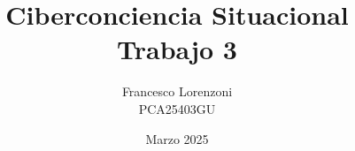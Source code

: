
\usepackage[T1]{fontenc}
\usepackage{lmodern}

\title{Ciberconciencia Situacional\\Trabajo 3}
\author{Francesco Lorenzoni\\\textsc{PCA25403GU}}


\date{Marzo 2025}


\makeatletter
\renewcommand{\l@section}{\@dottedtocline{1}{1.5em}{2.6em}}
\renewcommand{\l@subsection}{\@dottedtocline{2}{2.5em}{3.6em}}
\renewcommand{\l@subsubsection}{\@dottedtocline{3}{3.5em}{4.5em}}
\makeatother
{} %



\doparttoc[n]



\tableofcontents




